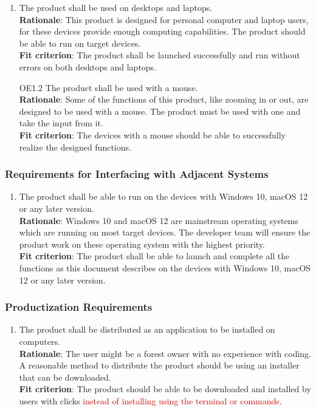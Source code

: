 \documentclass{article}
\begin{document}
\begin{enumerate}[OE1.1]
    \item The product shall be used on desktops and laptops.\\
    \textbf{Rationale}: This product is designed for personal computer and laptop users, for these
     devices provide enough computing capabilities. The product should be able to run on target
      devices.\\
    \textbf{Fit criterion}: The product shall be launched successfully and run without errors on both
     desktops and laptops.\\
   
    \item[OE1.2] The product shall be used with a mouse.\\
    \textbf{Rationale}: Some of the functions of this product, like zooming in or out, are designed to be used with a mouse. The product must be used with one and take the input from it.\\
    \textbf{Fit criterion}: The devices with a mouse should be able to successfully realize the designed functions.\\
\end{enumerate}

\subsubsection{Requirements for Interfacing with Adjacent Systems}
\begin{enumerate}[OE2.1]
    \item The product shall be able to run on the devices with Windows 10, macOS 12 or any later version.\\
    \textbf{Rationale}: Windows 10 and macOS 12 are mainstream operating systems which are running on most target devices. The developer team will ensure the product work on these operating system with the highest priority.\\
    \textbf{Fit criterion}: The product shall be able to launch and complete all the functions as this document describes on the devices with Windows 10, macOS 12 or any later version.\\
\end{enumerate}
\subsubsection{Productization Requirements}
\begin{enumerate}[OE3.1]
    \item The product shall be distributed as an application to be installed on computers.\\
    \textbf{Rationale}: The user might be a forest owner with no experience with coding. A reasonable method to distribute the product should be using an installer that can be downloaded. \\
    \textbf{Fit criterion}: The product should be able to be downloaded and installed by users with clicks \textcolor{red}{instead of installing using the terminal or commands}. \\
\end{enumerate}
\end{document}
